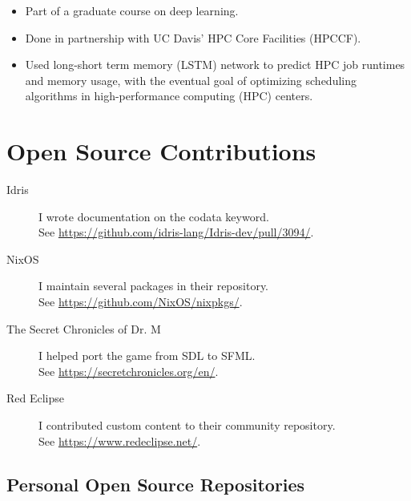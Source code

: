\documentclass[11pt,a4paper]{moderncv}
\newcommand{\osscontrib}[3]{\item[#1] #2\hfill\\See #3.}
\begin{document}
\begin{description}
        \begin{itemize}
        \item Part of a graduate course on deep learning.
            
        \item Done in partnership with UC Davis' HPC Core Facilities
          (HPCCF).

        \item Used long-short term memory (LSTM) network to predict
          HPC job runtimes and memory usage, with the eventual goal of
          optimizing scheduling algorithms in high-performance
          computing (HPC) centers.
        \end{itemize}
\end{description}


\section*{Open Source Contributions}

\begin{description}
    \osscontrib{Idris}{I wrote documentation on the codata keyword.}{\url{https://github.com/idris-lang/Idris-dev/pull/3094/}}

    \osscontrib{NixOS}{I maintain several packages in their repository.}{\url{https://github.com/NixOS/nixpkgs/}}

    \osscontrib{The Secret Chronicles of Dr. M}{I helped port the game
    from SDL to SFML.}{\url{https://secretchronicles.org/en/}}

    \osscontrib{Red Eclipse}{I contributed custom content to their community
    repository.}{\url{https://www.redeclipse.net/}}
\end{description}

\subsection*{Personal Open Source Repositories}
\end{document}
